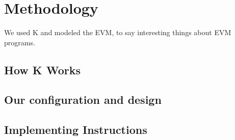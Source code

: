 \section{Methodology}
We used K and modeled the EVM, to say interesting things about EVM programs.
\subsection{How K Works}
\subsection{Our configuration and design}
\subsection{Implementing Instructions}
